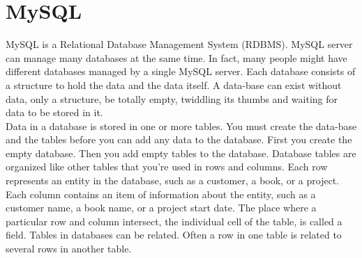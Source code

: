 \thispagestyle{fancy}

\section{MySQL}
MySQL is a Relational Database Management System (RDBMS). MySQL server can
manage many databases at the same time. In fact, many people might have different databases managed by a single MySQL server. Each database consists of a structure to hold the data and the data itself. A data-base can exist without data, only a structure, be totally empty, twiddling its thumbs and waiting for data to be stored in it.\\

Data in a database is stored in one or more tables. You must create the data-base and the tables before you can add any data to the database. First you create the empty database. Then you add empty tables to the database. Database tables are organized like other tables that you’re used in rows and columns. Each row represents an entity in the database, such as a customer, a book, or a project. Each column contains an item of information about the entity, such as a customer name, a book name, or a project start date. The place where a particular row and column intersect, the individual cell of the table, is called a field. Tables in databases can be related. Often a row in one table is related to several rows in another table.\\

